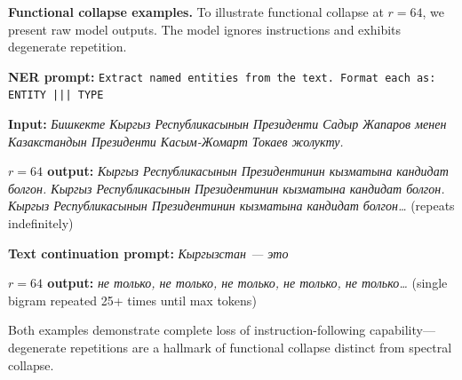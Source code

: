 \documentclass[11pt]{article}
\begin{document}
\noindent\textbf{Functional collapse examples.}
To illustrate functional collapse at $r{=}64$, we present raw model outputs. The model ignores instructions and exhibits degenerate repetition.

{\small
\textbf{NER prompt:} \texttt{Extract named entities from the text. Format each as: ENTITY ||| TYPE}

\textbf{Input:} {\cyrfont\textit{Бишкекте Кыргыз Республикасынын Президенти Садыр Жапаров менен Казакстандын Президенти Касым-Жомарт Токаев жолукту.}}

\textbf{$r{=}64$ output:} {\cyrfont\textit{Кыргыз Республикасынын Президентинин кызматына кандидат болгон. Кыргыз Республикасынын Президентинин кызматына кандидат болгон. Кыргыз Республикасынын Президентинин кызматына кандидат болгон\ldots}} (repeats indefinitely)

\textbf{Text continuation prompt:} {\cyrfont\textit{Кыргызстан --- это}}

\textbf{$r{=}64$ output:} {\cyrfont\textit{не только, не только, не только, не только, не только\ldots}} (single bigram repeated 25+ times until max tokens)

Both examples demonstrate complete loss of instruction-following capability---degenerate repetitions are a hallmark of functional collapse distinct from spectral collapse.
}
\end{document}

